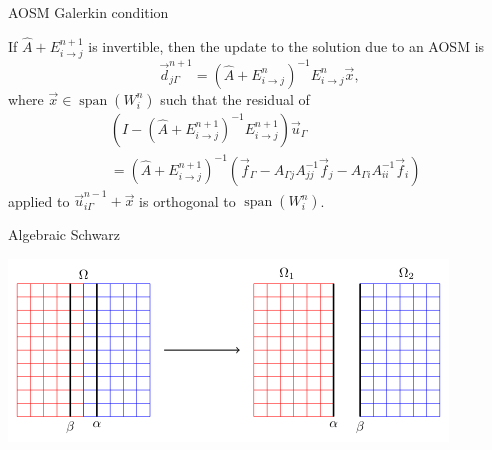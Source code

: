 \documentclass{beamer}
\newcommand{\Aij}{\left ( \hat{A} + E_{i \to j}^{n} \right )^{-1}}
\newcommand{\AijE}{\Aij E_{i \to j}^{n}}
\DeclareMathOperator{\Span}{span}
\begin{document}
\begin{frame}{AOSM Galerkin condition}

\begin{theorem} \label{thm: opt}
If $\hat{A} + E_{i \to j}^{n+1}$ is invertible, then the update to the solution due to an AOSM is $$\vec{d}_{j \Gamma}^{n+1} = \AijE \vec{x},$$ where
$\vec{x} \in  \Span(W_i^n)$ such that the residual of
\begin{align*}
	& \left ( I - \left ( \hat{A} + E_{i \to j}^{n+1} \right )^{-1} E_{i \to j}^{n+1} \right ) \vec{u}_\Gamma \\
	& = \left ( \hat{A} + E_{i \to j}^{n+1} \right )^{-1} \left ( \vec{f}_\Gamma - A_{\Gamma j} A_{jj}^{-1} \vec{f}_j - A_{\Gamma i} A_{ii}^{-1} \vec{f}_i \right )
\end{align*}
applied to $\vec{u}_{i \Gamma}^{n-1} + \vec{x}$ is orthogonal to $\Span(W_i^n)$. 
\end{theorem}
\end{frame}




\begin{frame}{Algebraic Schwarz}

\includegraphics[width=\textwidth]{AOSM/TIKZ_AOSM_20230614_1.png}
\end{frame}
\end{document}
